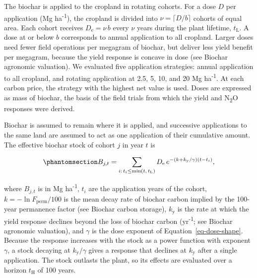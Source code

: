 \documentclass[
  letterpaper,
  twoside,
  twocolumn,
  9pt]{article}
\begin{document}
The biochar is applied to the cropland in rotating cohorts. For a dose
\(D\) per application (Mg ha\textsuperscript{-1}), the cropland is
divided into \(\nu = \lceil D/b \rceil\) cohorts of equal area. Each
cohort receives \(D_{\mathrm{e}} = \nu\, b\) every \(\nu\) years during
the plant lifetime, \(t_{\mathrm{L}}\). A dose at or below \(b\)
corresponds to annual application to all cropland. Larger doses need
fewer field operations per megagram of biochar, but deliver less yield
benefit per megagram, because the yield response is concave in dose (see
Biochar agronomic valuation). We evaluated five application strategies:
annual application to all cropland, and rotating application at 2.5, 5,
10, and 20 Mg ha\textsuperscript{-1}. At each carbon price, the strategy
with the highest net value is used. Doses are expressed as mass of
biochar, the basis of the field trials from which the yield and
N\textsubscript{2}O responses were derived.

Biochar is assumed to remain where it is applied, and successive
applications to the same land are assumed to act as one application of
their cumulative amount. The effective biochar stock of cohort \(j\) in
year \(t\) is

\begin{equation}\phantomsection\label{eq-bc-stock}{B_{j,t} = \sum_{i:\, t_i \le \min(t,\, t_{\mathrm{L}})} D_{\mathrm{e}}\, e^{-(k + k_{\mathrm{y}}/\gamma)(t - t_i)},}\end{equation}

where \(B_{j,t}\) is in Mg ha\textsuperscript{-1}, \(t_i\) are the
application years of the cohort, \(k = -\ln F_{\mathrm{perm}}/100\) is
the mean decay rate of biochar carbon implied by the 100-year permanence
factor (see Biochar carbon storage), \(k_{\mathrm{y}}\) is the rate at
which the yield response declines beyond the loss of biochar carbon
(yr\textsuperscript{-1}; see Biochar agronomic valuation), and
\(\gamma\) is the dose exponent of Equation~\ref{eq-dose-shape}. Because
the response increases with the stock as a power function with exponent
\(\gamma\), a stock decaying at \(k_{\mathrm{y}}/\gamma\) gives a
response that declines at \(k_{\mathrm{y}}\) after a single application.
The stock outlasts the plant, so its effects are evaluated over a
horizon \(t_{\mathrm{H}}\) of 100 years.
\end{document}
